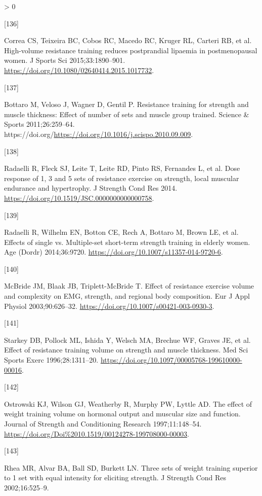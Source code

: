 \documentclass[twoside,10pt]{gihclass} %
\newlength{\cslhangindent}
\newlength{\csllabelwidth}
\newenvironment{CSLReferences}[3] %
 {%
  \setlength{\parindent}{0pt}
  \ifodd #1 \everypar{\setlength{\hangindent}{\cslhangindent}}\ignorespaces\fi
  \ifnum #2 > 0
  \setlength{\parskip}{#2\baselineskip}
  \fi
 }%
 {}
\newcommand{\CSLLeftMargin}[1]{\parbox[t]{\maxof{\widthof{#1}}{\csllabelwidth}}{#1}}
\newcommand{\CSLRightInline}[1]{\parbox[t]{\linewidth}{#1}}
\begin{document}
\begin{CSLReferences}{0}{0}
\leavevmode\hypertarget{ref-RN2464}{}%
\CSLLeftMargin{{[}136{]} }
\CSLRightInline{Correa CS, Teixeira BC, Cobos RC, Macedo RC, Kruger RL, Carteri RB, et al. High-volume resistance training reduces postprandial lipaemia in postmenopausal women. J Sports Sci 2015;33:1890--901. \url{https://doi.org/10.1080/02640414.2015.1017732}.}

\leavevmode\hypertarget{ref-RN2463}{}%
\CSLLeftMargin{{[}137{]} }
\CSLRightInline{Bottaro M, Veloso J, Wagner D, Gentil P. Resistance training for strength and muscle thickness: Effect of number of sets and muscle group trained. Science \& Sports 2011;26:259--64. https://doi.org/\url{https://doi.org/10.1016/j.scispo.2010.09.009}.}

\leavevmode\hypertarget{ref-RN1570}{}%
\CSLLeftMargin{{[}138{]} }
\CSLRightInline{Radaelli R, Fleck SJ, Leite T, Leite RD, Pinto RS, Fernandes L, et al. Dose response of 1, 3 and 5 sets of resistance exercise on strength, local muscular endurance and hypertrophy. J Strength Cond Res 2014. \url{https://doi.org/10.1519/JSC.0000000000000758}.}

\leavevmode\hypertarget{ref-RN1518}{}%
\CSLLeftMargin{{[}139{]} }
\CSLRightInline{Radaelli R, Wilhelm EN, Botton CE, Rech A, Bottaro M, Brown LE, et al. Effects of single vs. Multiple-set short-term strength training in elderly women. Age (Dordr) 2014;36:9720. \url{https://doi.org/10.1007/s11357-014-9720-6}.}

\leavevmode\hypertarget{ref-RN1474}{}%
\CSLLeftMargin{{[}140{]} }
\CSLRightInline{McBride JM, Blaak JB, Triplett-McBride T. Effect of resistance exercise volume and complexity on EMG, strength, and regional body composition. Eur J Appl Physiol 2003;90:626--32. \url{https://doi.org/10.1007/s00421-003-0930-3}.}

\leavevmode\hypertarget{ref-RN1456}{}%
\CSLLeftMargin{{[}141{]} }
\CSLRightInline{Starkey DB, Pollock ML, Ishida Y, Welsch MA, Brechue WF, Graves JE, et al. Effect of resistance training volume on strength and muscle thickness. Med Sci Sports Exerc 1996;28:1311--20. \url{https://doi.org/10.1097/00005768-199610000-00016}.}

\leavevmode\hypertarget{ref-RN1454}{}%
\CSLLeftMargin{{[}142{]} }
\CSLRightInline{Ostrowski KJ, Wilson GJ, Weatherby R, Murphy PW, Lyttle AD. The effect of weight training volume on hormonal output and muscular size and function. Journal of Strength and Conditioning Research 1997;11:148--54. \url{https://doi.org/Doi\%2010.1519/00124278-199708000-00003}.}

\leavevmode\hypertarget{ref-RN1384}{}%
\CSLLeftMargin{{[}143{]} }
\CSLRightInline{Rhea MR, Alvar BA, Ball SD, Burkett LN. Three sets of weight training superior to 1 set with equal intensity for eliciting strength. J Strength Cond Res 2002;16:525--9.}


\end{CSLReferences}
\end{document}
